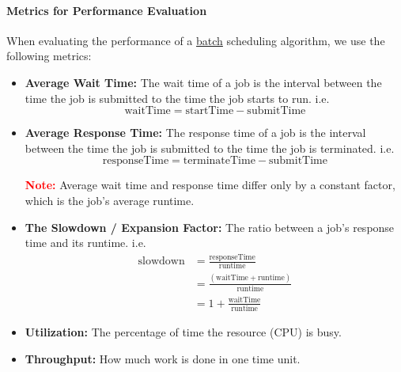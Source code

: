 \documentclass[openany,12pt]{book}
\newcommand{\red}[1]{\textcolor{Red}{#1}}
\begin{document}
\paragraph{Metrics for Performance Evaluation}
When evaluating the performance of a \underline{batch} scheduling algorithm, we use the following metrics:
\begin{itemize}
  \item \textbf{Average Wait Time:} The wait time of a job is the interval between the time the job is submitted to the time the job starts to run. i.e.
        \begin{equation*}
          \text{waitTime} = \text{startTime} - \text{submitTime}
        \end{equation*}

  \item \textbf{Average Response Time:} The response time of a job is the interval between the time the job is submitted to the time the job is terminated. i.e.
        \begin{equation*}
          \text{responseTime} = \text{terminateTime} - \text{submitTime}
        \end{equation*}

        \red{\textbf{Note:}} Average wait time and response time differ only by a constant factor, which is the job's average runtime.

  \item \textbf{The Slowdown / Expansion Factor:} The ratio between a job's response time and its runtime. i.e.
        \begin{equation*}
          \begin{aligned}
            \text{slowdown} & = \frac{\text{responseTime}}{\text{runtime}}                \\
                            & = \frac{(\text{waitTime} + \text{runtime})}{\text{runtime}} \\
                            & = 1 + \frac{\text{waitTime}}{\text{runtime}}
          \end{aligned}
        \end{equation*}

  \item \textbf{Utilization:} The percentage of time the resource (CPU) is busy.

  \item \textbf{Throughput:} How much work is done in one time unit.
\end{itemize}
\end{document}
